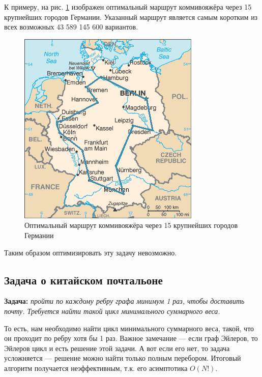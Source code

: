 К примеру, на рис. \ref{ris1} изображен оптимальный маршрут коммивояжёра через 15 крупнейших городов Германии. Указанный маршрут является самым коротким из всех возможных 43 589 145 600 вариантов.
\begin{figure}[h!]
	\centering
	\includegraphics[width=0.5\linewidth]{lection_21/germany}
	\caption{Оптимальный маршрут коммивояжёра через 15 крупнейших городов Германии}
	\label{ris1}
\end{figure}

Таким образом оптимизировать эту задачу невозможно.

\subsection{Задача о китайском почтальоне}
\textbf{Задача:} \emph{пройти по каждому ребру графа минимум 1 раз, чтобы доставить почту. Требуется найти такой цикл минимального суммарного веса.}

То есть, нам необходимо найти цикл минимального суммарного веса, такой, что он проходит по ребру хотя бы 1 раз. Важное замечание --- если граф Эйлеров, то Эйлеров цикл и есть решение этой задачи. А вот если его нет, то задача усложняется --- решение можно найти только полным перебором. Итоговый алгоритм получается неэффективным, т.к. его асимптотика $O(N!)$.